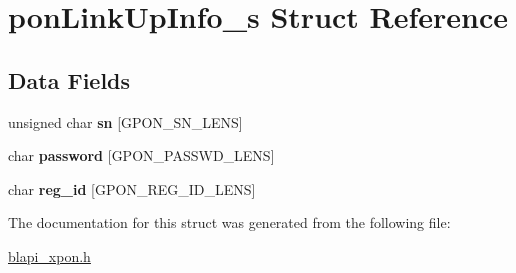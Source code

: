 \hypertarget{structponLinkUpInfo__s}{}\section{pon\+Link\+Up\+Info\+\_\+s Struct Reference}
\label{structponLinkUpInfo__s}
\subsection*{Data Fields}
\begin{DoxyCompactItemize}
\item 
\mbox{\label{structponLinkUpInfo__s_a7389a4eda90ab1e6d242ca1fd8deb9c1}} 
unsigned char {\bfseries sn} \mbox{[}G\+P\+O\+N\+\_\+\+S\+N\+\_\+\+L\+E\+NS\mbox{]}
\item 
\mbox{\label{structponLinkUpInfo__s_aded03751c6a1ae5382216b70c7251d64}} 
char {\bfseries password} \mbox{[}G\+P\+O\+N\+\_\+\+P\+A\+S\+S\+W\+D\+\_\+\+L\+E\+NS\mbox{]}
\item 
\mbox{\label{structponLinkUpInfo__s_a36cdacaa674acf3f57c422ae79222f27}} 
char {\bfseries reg\+\_\+id} \mbox{[}G\+P\+O\+N\+\_\+\+R\+E\+G\+\_\+\+I\+D\+\_\+\+L\+E\+NS\mbox{]}
\end{DoxyCompactItemize}


The documentation for this struct was generated from the following file\+:\begin{DoxyCompactItemize}
\item 
\hyperlink{blapi__xpon_8h}{blapi\+\_\+xpon.\+h}\end{DoxyCompactItemize}

